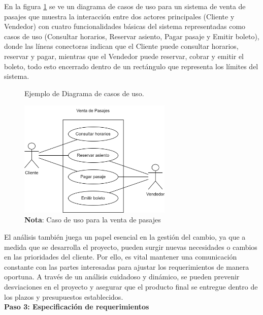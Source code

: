 		\vspace{-12pt}  %
		En la figura \ref{fig:figura_caso_uso} se ve un diagrama de casos de uso para un sistema de venta de pasajes que muestra la interacción entre dos actores principales (Cliente y Vendedor) con cuatro funcionalidades básicas del sistema representadas como casos de uso (Consultar horarios, Reservar asiento, Pagar pasaje y Emitir boleto), donde las líneas conectoras indican que el Cliente puede consultar horarios, reservar y pagar, mientras que el Vendedor puede reservar, cobrar y emitir el boleto, todo esto encerrado dentro de un rectángulo que representa los límites del sistema.
		
		\vspace{0.3cm} %
		
		\begin{figure}[h] %
			\caption[Ejemplo Diagrama de casos de uso]
			{\newline Ejemplo de Diagrama de casos de uso.} %
			\vspace{0.3cm}
			\centering
			\includegraphics[width=0.65\textwidth]{imagenes/diagramas_casos_de_uso/venta-pasajes-casos-uso.png} %
			\vspace{0.3cm}
			\caption*{\textup{\textbf{Nota}: Caso de uso para la venta de pasajes}}
			\vspace{-0.75cm}
			\label{fig:figura_caso_uso} %
		\end{figure}		
		
		El análisis también juega un papel esencial en la gestión del cambio, ya que a medida que se desarrolla el proyecto, pueden surgir nuevas necesidades o cambios en las prioridades del cliente. Por ello, es vital mantener una comunicación constante con las partes interesadas para ajustar los requerimientos de manera oportuna. A través de un análisis cuidadoso y dinámico, se pueden prevenir desviaciones en el proyecto y asegurar que el producto final se entregue dentro de los plazos y presupuestos establecidos.\\
		\textbf{Paso 3: Especificación de requerimientos}
		
